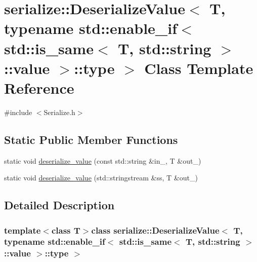 \hypertarget{classserialize_1_1_deserialize_value_3_01_t_00_01typename_01std_1_1enable__if_3_01std_1_1is__sambc4bb2b40dcc8b30285e8bdc35bf8b03}{}\section{serialize\+:\+:Deserialize\+Value$<$ T, typename std\+:\+:enable\+\_\+if$<$ std\+:\+:is\+\_\+same$<$ T, std\+:\+:string $>$\+:\+:value $>$\+:\+:type $>$ Class Template Reference}
\label{classserialize_1_1_deserialize_value_3_01_t_00_01typename_01std_1_1enable__if_3_01std_1_1is__sambc4bb2b40dcc8b30285e8bdc35bf8b03}


{\ttfamily \#include $<$Serialize.\+h$>$}

\subsection*{Static Public Member Functions}
\begin{DoxyCompactItemize}
\item 
static void \hyperlink{classserialize_1_1_deserialize_value_3_01_t_00_01typename_01std_1_1enable__if_3_01std_1_1is__sambc4bb2b40dcc8b30285e8bdc35bf8b03_a2540f84ec617252a8ce92375fac010aa}{deserialize\+\_\+value} (const std\+::string \&in\+\_\+, T \&out\+\_\+)
\item 
static void \hyperlink{classserialize_1_1_deserialize_value_3_01_t_00_01typename_01std_1_1enable__if_3_01std_1_1is__sambc4bb2b40dcc8b30285e8bdc35bf8b03_afbc20e3c6749cfafb3c0fffe41eb4bf6}{deserialize\+\_\+value} (std\+::stringstream \&ss, T \&out\+\_\+)
\end{DoxyCompactItemize}


\subsection{Detailed Description}
\subsubsection*{template$<$class T$>$class serialize\+::\+Deserialize\+Value$<$ T, typename std\+::enable\+\_\+if$<$ std\+::is\+\_\+same$<$ T, std\+::string $>$\+::value $>$\+::type $>$}



